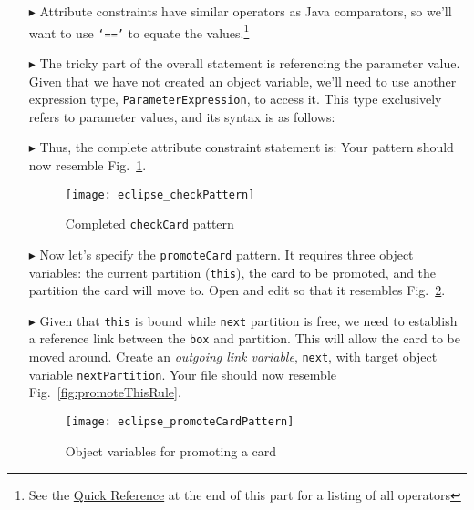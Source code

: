\begin{itemize}
\item[$\blacktriangleright$] Attribute constraints have similar operators as Java comparators, so we'll want to use \texttt{`=='} to equate the
values.\footnote{See the \hyperlink{quickRef}{Quick Reference} at the end of this part for a listing of all operators}

\item[$\blacktriangleright$] The tricky part of the overall statement is referencing the parameter value. Given that we have not created an object variable,
we'll need to use another expression type, \texttt{ParameterExpression}, to access it. This type exclusively refers to parameter
values, and its syntax is as follows:

\item[$\blacktriangleright$] Thus, the complete attribute constraint statement is:  Your pattern should now resemble
Fig.~\ref{fig:checkPattern}.

\vspace{0.5cm}

\begin{figure}[htbp]
\begin{center}
  \texttt{[image: eclipse\_checkPattern]}
  \caption{Completed \texttt{checkCard} pattern}
  \label{fig:checkPattern}
\end{center}
\end{figure} 

\item[$\blacktriangleright$] Now let's specify the \texttt{promoteCard} pattern. It requires three object variables: the current partition (\texttt{this}),
the card to be promoted, and the partition the card will move to. Open and edit so that it resembles Fig.~\ref{fig:promoteCardPattern}.

\item[$\blacktriangleright$] Given that \texttt{this} is bound while \texttt{next} partition is free, we need to establish a reference link between the
\texttt{box} and partition. This will allow the card to be moved around. Create an \emph{outgoing link variable}, \texttt{next},  with target object variable
\texttt{nextPartition}. Your file should now resemble Fig.~\ref{fig:promoteThisRule}.

\begin{figure}[htbp]
\begin{center}
  \texttt{[image: eclipse\_promoteCardPattern]}
  \caption{Object variables for promoting a card}
  \label{fig:promoteCardPattern}
\end{center}
\end{figure} 


\end{itemize}
